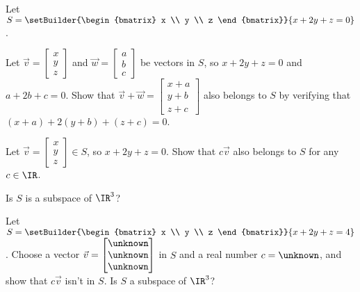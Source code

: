 \begin{applicationActivities}
\begin{activity}{15}
Let \(S=\setBuilder{\begin{bmatrix} x \\ y \\ z \end{bmatrix}}{ x+2y+z=0}\).

\begin{subactivity}
  Let \(\vec{v}=\begin{bmatrix} x \\ y \\ z \end{bmatrix}\) and
  \(\vec{w} = \begin{bmatrix} a \\ b \\ c \end{bmatrix} \) be vectors in \(S\),
  so \(x+2y+z=0\) and \(a+2b+c=0\). Show that
  \(\vec v+\vec w = \begin{bmatrix} x+a \\ y+b \\ z+c \end{bmatrix}\)
  also belongs to \(S\) by verifying that \((x+a)+2(y+b)+(z+c)=0\).
\end{subactivity}
\begin{subactivity}
  Let \(\vec{v}=\begin{bmatrix} x \\ y \\ z \end{bmatrix}\in S\), so
  \(x+2y+z=0\). Show that \(c\vec v\) also belongs to \(S\) for any
  \(c\in\IR\).
\end{subactivity}
\begin{subactivity}
  Is \(S\) is a subspace of \(\IR^3\)?
\end{subactivity}
\end{activity}

\begin{activity}{10}
Let \(S=\setBuilder{\begin{bmatrix} x \\ y \\ z \end{bmatrix}}{ x+2y+z=4}\).
Choose a vector
\(\vec v=\begin{bmatrix} \unknown\\\unknown\\\unknown \end{bmatrix}\) in \(S\)
and a real number \(c=\unknown\), and show that \(c\vec v\) isn't in \(S\).
Is \(S\) a subspace of \(\IR^3\)?
\end{activity}


\end{applicationActivities}
